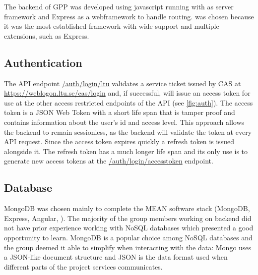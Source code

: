 
The backend of GPP was developed using javascript running with \nodejs{} as server framework and Express as a webframework to handle routing. \nodejs{} was chosen because it was the most established framework with wide support and multiple extensions, such as Express.

\subsection{Authentication}
The API endpoint \url{/auth/login/ltu} validates a service ticket issued by CAS at \url{https://weblogon.ltu.se/cas/login} and, if successful, will issue an access token for use at the other access restricted endpoints of the API (see \ref{fig:auth}). The access token is a JSON Web Token with a short life span that is tamper proof and contains information about the user's id and access level. This approach allows the backend to remain sessionless, as the backend will validate the token at every API request. Since the access token expires quickly a refresh token is issued alongside it. The refresh token has a much longer life span and its only use is to generate new access tokens at the \url{/auth/login/accesstoken} endpoint.

\subsection{Database} \label{database}


MongoDB was chosen mainly to complete the MEAN software stack (MongoDB, Express, Angular, \nodejs{}). The majority of the group members working on backend did not have prior experience working with NoSQL databases which presented a good opportunity to learn. MongoDB is a popular choice among NoSQL databases and the group deemed it able to simplify when interacting with the data: Mongo uses a JSON-like document structure and JSON is the data format used when different parts of the project services communicates. 

